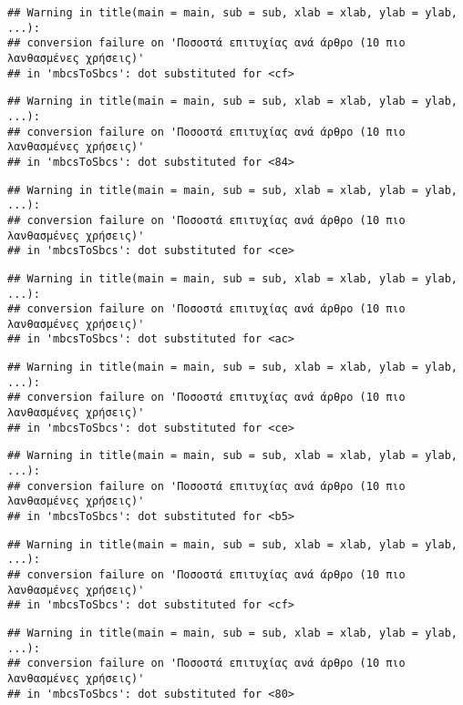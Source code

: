 \documentclass[
]{article}
\begin{document}
\begin{verbatim}
## Warning in title(main = main, sub = sub, xlab = xlab, ylab = ylab, ...):
## conversion failure on 'Ποσοστά επιτυχίας ανά άρθρο (10 πιο λανθασμένες χρήσεις)'
## in 'mbcsToSbcs': dot substituted for <cf>
\end{verbatim}

\begin{verbatim}
## Warning in title(main = main, sub = sub, xlab = xlab, ylab = ylab, ...):
## conversion failure on 'Ποσοστά επιτυχίας ανά άρθρο (10 πιο λανθασμένες χρήσεις)'
## in 'mbcsToSbcs': dot substituted for <84>
\end{verbatim}

\begin{verbatim}
## Warning in title(main = main, sub = sub, xlab = xlab, ylab = ylab, ...):
## conversion failure on 'Ποσοστά επιτυχίας ανά άρθρο (10 πιο λανθασμένες χρήσεις)'
## in 'mbcsToSbcs': dot substituted for <ce>
\end{verbatim}

\begin{verbatim}
## Warning in title(main = main, sub = sub, xlab = xlab, ylab = ylab, ...):
## conversion failure on 'Ποσοστά επιτυχίας ανά άρθρο (10 πιο λανθασμένες χρήσεις)'
## in 'mbcsToSbcs': dot substituted for <ac>
\end{verbatim}

\begin{verbatim}
## Warning in title(main = main, sub = sub, xlab = xlab, ylab = ylab, ...):
## conversion failure on 'Ποσοστά επιτυχίας ανά άρθρο (10 πιο λανθασμένες χρήσεις)'
## in 'mbcsToSbcs': dot substituted for <ce>
\end{verbatim}

\begin{verbatim}
## Warning in title(main = main, sub = sub, xlab = xlab, ylab = ylab, ...):
## conversion failure on 'Ποσοστά επιτυχίας ανά άρθρο (10 πιο λανθασμένες χρήσεις)'
## in 'mbcsToSbcs': dot substituted for <b5>
\end{verbatim}

\begin{verbatim}
## Warning in title(main = main, sub = sub, xlab = xlab, ylab = ylab, ...):
## conversion failure on 'Ποσοστά επιτυχίας ανά άρθρο (10 πιο λανθασμένες χρήσεις)'
## in 'mbcsToSbcs': dot substituted for <cf>
\end{verbatim}

\begin{verbatim}
## Warning in title(main = main, sub = sub, xlab = xlab, ylab = ylab, ...):
## conversion failure on 'Ποσοστά επιτυχίας ανά άρθρο (10 πιο λανθασμένες χρήσεις)'
## in 'mbcsToSbcs': dot substituted for <80>
\end{verbatim}
\end{document}
